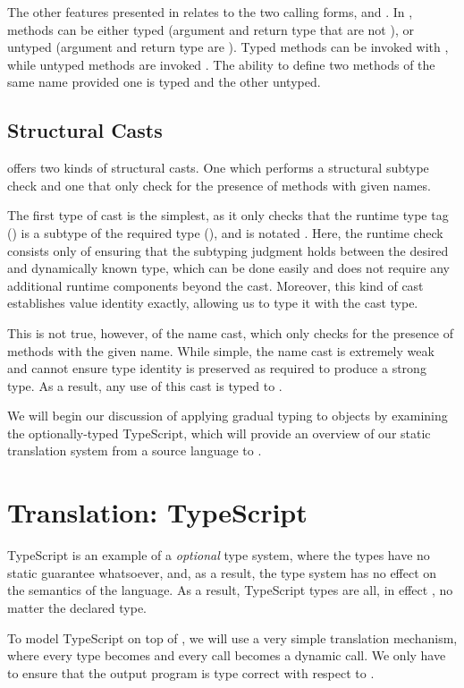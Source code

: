 \documentclass[a4paper,USenglish]{tex/lipics-v2016}
\begin{document}
The other features presented in \kafka relates to the two calling forms,
\Call\e\m\e and \DynCall\e\m\e. In \kafka, methods can be either typed
(argument and return type that are not \any), or untyped (argument and
return type are \any). Typed methods can be invoked with \Call\e\m\e, while
untyped methods are invoked \DynCall\e\m\e. The ability to define two
methods of the same name provided one is typed and the other untyped.


\subsection{Structural Casts}

\kafka offers two kinds of structural casts. One which performs a structural
subtype check and one that only check for the presence of methods with given
names. 

The first type of cast is the simplest, as it only checks that the runtime type
tag (\C) is a subtype of the required type (\D), and is notated \SubCast\D\e.
Here, the runtime check consists only of ensuring that the subtyping judgment
holds between the desired and dynamically known type, which can be done easily
and does not require any additional runtime  components beyond the cast.
Moreover, this kind of cast establishes value identity exactly, allowing us to
type it with the cast type.

This is not true, however, of the name cast, which only checks for the
presence of methods with the given name. While simple, the name cast is
extremely weak and cannot ensure type identity is preserved as required to
produce a strong \kafka type. As a result, any use of this cast is typed to
\any.

We will begin our discussion of applying gradual typing to objects by examining
the optionally-typed TypeScript, which will provide an overview of our static 
translation system from a source language to \kafka.

\section{Translation: TypeScript}

TypeScript is an example of a \emph{optional} type system, where the types have
no static guarantee whatsoever, and, as a result, the type system has no effect
on the semantics of the language. As a result, TypeScript types are all, in
effect \any, no matter the declared type.

To model TypeScript on top of \kafka, we will use a very simple translation 
mechanism, where every type becomes \any and every call becomes a dynamic call.
We only have to ensure that the output program is type correct with respect to
\kafka.
\end{document}
